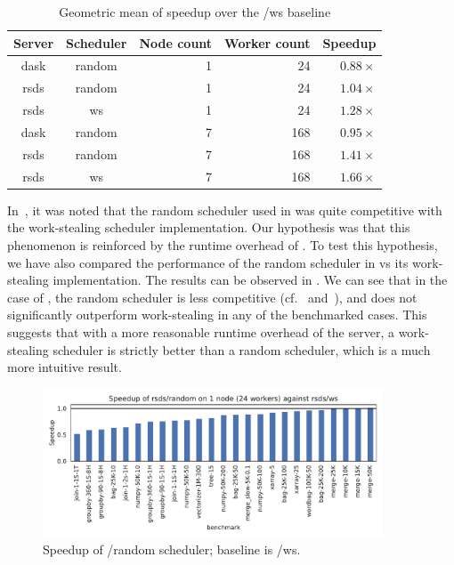 \setlength{\tabcolsep}{5pt}
\begin{table}
	\centering
	\begin{tabular}{c|c|r|r|r}
		\textbf{Server} & \textbf{Scheduler} & \textbf{Node count} & \textbf{Worker	count} &
		\textbf{Speedup}                                                                                 \\
		\midrule
		dask            & random             & 1                   & 24                   & $0.88\times$ \\
		rsds            & random             & 1                   & 24                   & $1.04\times$ \\
		rsds            & ws                 & 1                   & 24                   & $1.28\times$ \\
		dask            & random             & 7                   & 168                  & $0.95\times$ \\
		rsds            & random             & 7                   & 168                  & $1.41\times$ \\
		rsds            & ws                 & 7                   & 168                  & $1.66\times$ \\
	\end{tabular}
	\caption{Geometric mean of speedup over the \dask{}/ws baseline}
	\label{tab:rsds-geom-mean-speedup}
\end{table}

In~, it was noted that the random scheduler used in
\dask{} was quite competitive with the work-stealing scheduler implementation.
Our hypothesis was that this phenomenon is reinforced by the runtime overhead of
\dask{}. To test this hypothesis, we have also compared the performance of the
random scheduler in \rsds{} vs its work-stealing implementation. The results
can be observed in . We can see that in the case of
\rsds{}, the random scheduler is less competitive
(cf.~ and~), and does not significantly
outperform work-stealing in any of the benchmarked cases. This suggests that with a more reasonable
runtime overhead of the server, a work-stealing scheduler is strictly better than a random
scheduler, which is a much more intuitive result.

\begin{figure}
	\centering
	\includegraphics[width=0.9\textwidth]{./imgs/rsds/charts/speedup-rsds-random-1-baseline-rsds-ws}
	\caption{Speedup of \rsds{}/random scheduler; baseline is \rsds{}/ws.}
	\label{fig:rsds-random-baseline}
\end{figure}

